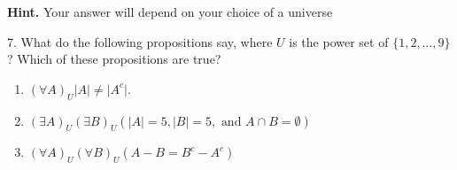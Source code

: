 \documentclass[10pt,]{book}
\theoremstyle{plain}
\theoremstyle{definition}
\theoremstyle{definition}
\theoremstyle{definition}
\theoremstyle{definition}
\begin{document}
\begin{exercisegroup}
\par\smallskip
\par\smallskip
\noindent\textbf{Hint.}\hypertarget{hint-3}{}\quad
Your answer will depend on your choice of a universe%
\item[7.]\hypertarget{exercise-58}{}What do the following propositions say, where \(U\) is the power set of \(\{1,2,\dots , 9\}\)? Which of these propositions are true?%
\par
\leavevmode%
\begin{enumerate}[label=\alph*]
\item\hypertarget{li-317}{}\((\forall A)_U \lvert A \rvert \neq \lvert A^c \rvert\).%
\item\hypertarget{li-318}{} \((\exists A)_U(\exists B)_U (\lvert A \rvert =5, \lvert B \rvert=5, \textrm{ and } A\cap B=\emptyset )\)%
\item\hypertarget{li-319}{} \((\forall A)_U(\forall B)_U (A-B=B^c-A^c)\)%
\end{enumerate}


\end{exercisegroup}
\end{document}
